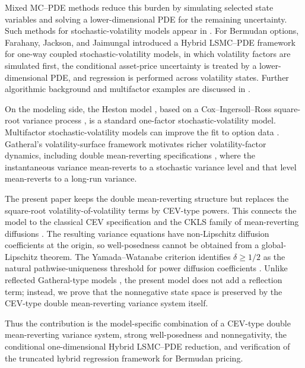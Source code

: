 \documentclass[pdflatex,sn-mathphys-num]{sn-jnl}
\theoremstyle{thmstyleone}%
\theoremstyle{thmstylethree}%
\theoremstyle{thmstyletwo}%
\begin{document}
Mixed MC--PDE methods reduce this burden by simulating selected state variables
and solving a lower-dimensional PDE for the remaining uncertainty. Such methods
for stochastic-volatility models appear in
\cite{loeper2009mixed,lipp2013mixing,cozma2017mixed}. For Bermudan options,
Farahany, Jackson, and Jaimungal \cite{farahany2020mixing} introduced a Hybrid
LSMC--PDE framework for one-way coupled stochastic-volatility models, in which
volatility factors are simulated first, the conditional asset-price uncertainty
is treated by a lower-dimensional PDE, and regression is performed across
volatility states. Further algorithmic background and multifactor examples are
discussed in \cite{farahany2019thesis}.

On the modeling side, the Heston model \cite{heston1993closedform}, based on a
Cox--Ingersoll--Ross square-root variance process \cite{cir1985termstructure},
is a standard one-factor stochastic-volatility model. Multifactor
stochastic-volatility models can improve the fit to option data
\cite{christoffersen2009smirk}. Gatheral's volatility-surface framework
\cite{gatheral2006volsurface} motivates richer volatility-factor dynamics,
including double mean-reverting specifications \cite{bayer2013fast}, where the
instantaneous variance mean-reverts to a stochastic variance level and that level
mean-reverts to a long-run variance.

The present paper keeps the double mean-reverting structure but replaces the
square-root volatility-of-volatility terms by CEV-type powers. This connects the
model to the classical CEV specification \cite{cox1975cev} and the CKLS family
of mean-reverting diffusions \cite{chan1992empirical}. The resulting variance
equations have non-Lipschitz diffusion coefficients at the origin, so
well-posedness cannot be obtained from a global-Lipschitz theorem. The
Yamada--Watanabe criterion identifies $\delta\ge 1/2$ as the natural
pathwise-uniqueness threshold for power diffusion coefficients
\cite{yamada1971uniqueness}. Unlike reflected Gatheral-type models
\cite{mishura2025skorokhod}, the present model does not add a reflection term;
instead, we prove that the nonnegative state space is preserved by the CEV-type
double mean-reverting variance system itself.

Thus the contribution is the model-specific combination of a CEV-type double
mean-reverting variance system, strong well-posedness and nonnegativity, the
conditional one-dimensional Hybrid LSMC--PDE reduction, and verification of the
truncated hybrid regression framework for Bermudan pricing.
\end{document}
